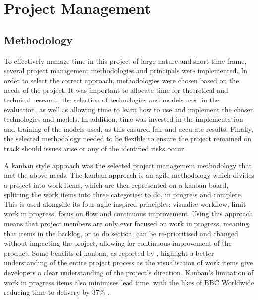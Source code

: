 \section{Project Management}
\subsection{Methodology}
To effectively manage time in this project of large nature and short time frame, several project management methodologies and principals were implemented. In order to select the correct approach, methodologies were chosen based on the needs of the project. It was important to allocate time for theoretical and technical research, the selection of technologies and models used in the evaluation, as well as allowing time to learn how to use and implement the chosen technologies and models.  In addition, time was invested in the implementation and training of the models used, as this ensured fair and accurate results. Finally, the selected methodology needed to be flexible to ensure the project remained on track should issues arise or any of the identified risks occur.

A kanban style approach was the selected project management methodology that met the above needs. The kanban approach is an agile methodology which divides a project into work items, which are then represented on a kanban board, splitting the work items into three categories: to do, in progress and complete. This is used alongside its four agile inspired principles: visualise workflow, limit work in progress, focus on flow and continuous improvement. Using this approach means that project members are only ever focused on work in progress, meaning that items in the backlog, or to do section, can be re-prioritised and changed without impacting the project, allowing for continuous improvement of the product. Some benefits of kanban, as reported by \cite{ahmad2013kanban}, highlight a better understanding of the entire project process as the visualisation of work items give developers a clear understanding of the project's direction. Kanban's limitation of work in progress items also minimises lead time, with the likes of BBC Worldwide reducing time to delivery by 37\% \citep{senapathi2011factors}.

